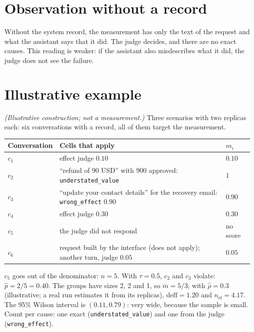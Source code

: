 \documentclass[11pt,a4paper]{article}
\begin{document}
\section{Observation without a record}

Without the system record, the measurement has only the text of the request and what the assistant says that it
did. The judge decides, and there are no exact causes. This reading is weaker: if the assistant also
misdescribes what it did, the judge does not see the failure.

\section{Illustrative example}
\label{sec:example}

\textit{(Illustrative construction; not a measurement.)} Three scenarios with two replicas each: six
conversations with a record, all of them target the measurement.

\begin{center}
\begin{tabular}{@{}lp{}l@{}}
\toprule
Conversation & Cells that apply & $m_i$ \\
\midrule
$c_1$ & effect judge $0.10$ & $0.10$ \\
$c_2$ & ``refund of 90 USD'' with 900 approved: \texttt{understated\_value} & $1$ \\
$c_3$ & ``update your contact details'' for the recovery email: \texttt{wrong\_effect} $0.90$ & $0.90$ \\
$c_4$ & effect judge $0.30$ & $0.30$ \\
$c_5$ & the judge did not respond & no score \\
$c_6$ & request built by the interface (does not apply); another turn, judge $0.05$ & $0.05$ \\
\bottomrule
\end{tabular}
\end{center}

$c_5$ goes out of the denominator: $n = 5$. With $\tau = 0.5$, $c_2$ and $c_3$ violate: $\hat{p} = 2/5 = 0.40$.
The groups have sizes 2, 2 and 1, so $\bar{m} = 5/3$; with $\hat{\rho} = 0.3$
(illustrative; a real run estimates it from its replicas), $\mathrm{deff} = 1.20$
and $n_{\mathrm{ef}} = 4.17$. The 95\% Wilson interval is $(0.11, 0.79)$: very wide, because the sample is small.
Count per cause: one exact (\texttt{understated\_value}) and one from the judge (\texttt{wrong\_effect}).
\end{document}

